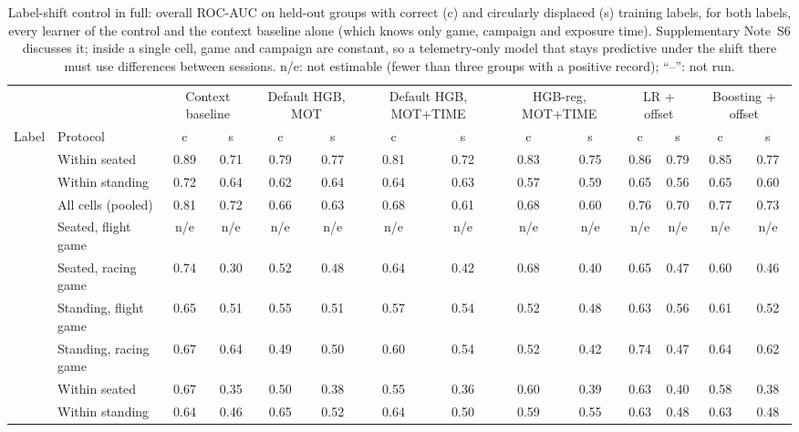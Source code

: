 \begin{table}[ht]
\centering
\scriptsize
\caption{Label-shift control in full: overall ROC-AUC on held-out groups with correct (c) and circularly displaced (s) training labels, for both labels, every learner of the control and the context baseline alone (which knows only game, campaign and exposure time). Supplementary Note~S6 discusses it; inside a single cell, game and campaign are constant, so a telemetry-only model that stays predictive under the shift there must use differences between sessions. n/e: not estimable (fewer than three groups with a positive record); ``--'': not run.}
\label{tab:supp_control}
\setlength{\tabcolsep}{2pt}
\begin{tabular}{@{}llcccccccccccc@{}}
\toprule
 & & \multicolumn{2}{c}{Context baseline} & \multicolumn{2}{c}{Default HGB, MOT} & \multicolumn{2}{c}{Default HGB, MOT+TIME} & \multicolumn{2}{c}{HGB-reg, MOT+TIME} & \multicolumn{2}{c}{LR + offset} & \multicolumn{2}{c}{Boosting + offset} \\
\cmidrule(lr){3-4}\cmidrule(lr){5-6}\cmidrule(lr){7-8}\cmidrule(lr){9-10}\cmidrule(lr){11-12}\cmidrule(lr){13-14}
Label & Protocol & c & s & c & s & c & s & c & s & c & s & c & s \\
\midrule
\sevtwo{} & Within seated & 0.89 & 0.71 & 0.79 & 0.77 & 0.81 & 0.72 & 0.83 & 0.75 & 0.86 & 0.79 & 0.85 & 0.77 \\
 & Within standing & 0.72 & 0.64 & 0.62 & 0.64 & 0.64 & 0.63 & 0.57 & 0.59 & 0.65 & 0.56 & 0.65 & 0.60 \\
 & All cells (pooled) & 0.81 & 0.72 & 0.66 & 0.63 & 0.68 & 0.61 & 0.68 & 0.60 & 0.76 & 0.70 & 0.77 & 0.73 \\
 & Seated, flight game & n/e & n/e & n/e & n/e & n/e & n/e & n/e & n/e & n/e & n/e & n/e & n/e \\
 & Seated, racing game & 0.74 & 0.30 & 0.52 & 0.48 & 0.64 & 0.42 & 0.68 & 0.40 & 0.65 & 0.47 & 0.60 & 0.46 \\
 & Standing, flight game & 0.65 & 0.51 & 0.55 & 0.51 & 0.57 & 0.54 & 0.52 & 0.48 & 0.63 & 0.56 & 0.61 & 0.52 \\
 & Standing, racing game & 0.67 & 0.64 & 0.49 & 0.50 & 0.60 & 0.54 & 0.52 & 0.42 & 0.74 & 0.47 & 0.64 & 0.62 \\
\midrule
\sevone{} & Within seated & 0.67 & 0.35 & 0.50 & 0.38 & 0.55 & 0.36 & 0.60 & 0.39 & 0.63 & 0.40 & 0.58 & 0.38 \\
 & Within standing & 0.64 & 0.46 & 0.65 & 0.52 & 0.64 & 0.50 & 0.59 & 0.55 & 0.63 & 0.48 & 0.63 & 0.48 \\

\end{tabular}
\end{table}
